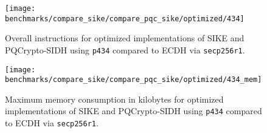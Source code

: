 \begin{figure}[H]
  \centering
  \texttt{[image: benchmarks/compare\_sike/compare\_pqc\_sike/optimized/434]}
  \caption[Overall instructions for optimized implementations of \gls{SIKE} and \gls{PQCrypto-SIDH} using \texttt{p434}]
  {Overall instructions for optimized implementations of \gls{SIKE} and \gls{PQCrypto-SIDH} using \texttt{p434} compared to \gls{ECDH} via \texttt{secp256r1}.}
  \label{fig:results_sike_pqc_opt_434}
\end{figure}

\begin{figure}[H]
  \centering
  \texttt{[image: benchmarks/compare\_sike/compare\_pqc\_sike/optimized/434\_mem]}
  \caption[Maximum memory consumption for optimized implementations of \gls{SIKE} and \gls{PQCrypto-SIDH} using \texttt{p434}]
  {Maximum memory consumption in kilobytes for optimized implementations of \gls{SIKE} and \gls{PQCrypto-SIDH} using \texttt{p434} compared to \gls{ECDH} via \texttt{secp256r1}.}
  \label{fig:results_sike_pqc_opt_434_mem}
\end{figure}

